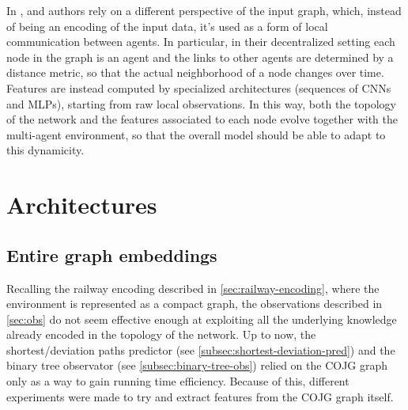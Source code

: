 \documentclass[a4paper,10pt]{report}
\begin{document}
In \cite{dgn}, \cite{dqn-gnn-robot} and \cite{magat} authors rely on a different perspective of the input graph, which, instead of being an encoding of the input data, it's used as a form of local communication between agents. In particular, in their decentralized setting each node in the graph is an agent and the links to other agents are determined by a distance metric, so that the actual neighborhood of a node changes over time. Features are instead computed by specialized architectures (sequences of CNNs and MLPs), starting from raw local observations. In this way, both the topology of the network and the features associated to each node evolve together with the multi-agent environment, so that the overall model should be able to adapt to this dynamicity. 

\section{Architectures}
\subsection{Entire graph embeddings}\label{subsec:entire-gnn}
Recalling the railway encoding described in \ref{sec:railway-encoding}, where the environment is represented as a compact graph, the observations described in \ref{sec:obs} do not seem effective enough at exploiting all the underlying knowledge already encoded in the topology of the network. Up to now, the shortest/deviation paths predictor (see \ref{subsec:shortest-deviation-pred}) and the binary tree observator (see \ref{subsec:binary-tree-obs}) relied on the COJG graph only as a way to gain running time efficiency. Because of this, different experiments were made to try and extract features from the COJG graph itself.
\end{document}

